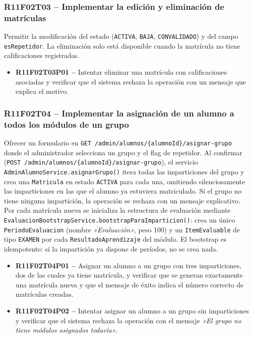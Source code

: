 \documentclass[12pt, a4paper]{report}
\begin{document}
\subsubsection{R11F02T03 -- Implementar la edición y eliminación de matrículas}
Permitir la modificación del estado (\texttt{ACTIVA}, \texttt{BAJA}, \texttt{CONVALIDADO}) y del campo \texttt{esRepetidor}. La eliminación solo está disponible cuando la matrícula no tiene calificaciones registradas.
\begin{itemize}
  \item \textbf{R11F02T03P01 --} Intentar eliminar una matrícula con calificaciones asociadas y verificar que el sistema rechaza la operación con un mensaje que explica el motivo.
\end{itemize}

\subsubsection{R11F02T04 -- Implementar la asignación de un alumno a todos los módulos de un grupo}
Ofrecer un formulario en \texttt{GET /admin/alumnos/\{alumnoId\}/asignar-grupo} donde el administrador selecciona un grupo y el flag de repetidor. Al confirmar (\texttt{POST /admin/alumnos/\{alumnoId\}/asignar-grupo}), el servicio \texttt{AdminAlumnoService.asignarGrupo()} itera todas las imparticiones del grupo y crea una \texttt{Matricula} en estado \texttt{ACTIVA} para cada una, omitiendo silenciosamente las imparticiones en las que el alumno ya estuviera matriculado. Si el grupo no tiene ninguna impartición, la operación se rechaza con un mensaje explicativo. Por cada matrícula nueva se inicializa la estructura de evaluación mediante \texttt{EvaluacionBootstrapService.bootstrapParaImparticion()}: crea un único \texttt{PeriodoEvaluacion} (nombre \textit{«Evaluación»}, peso 100) y un \texttt{ItemEvaluable} de tipo \texttt{EXAMEN} por cada \texttt{ResultadoAprendizaje} del módulo. El bootstrap es idempotente: si la impartición ya dispone de períodos, no se crea nada.
\begin{itemize}
  \item \textbf{R11F02T04P01 --} Asignar un alumno a un grupo con tres imparticiones, dos de las cuales ya tiene matrícula, y verificar que se generan exactamente una matrícula nueva y que el mensaje de éxito indica el número correcto de matrículas creadas.
  \item \textbf{R11F02T04P02 --} Intentar asignar un alumno a un grupo sin imparticiones y verificar que el sistema rechaza la operación con el mensaje \textit{«El grupo no tiene módulos asignados todavía»}.
\end{itemize}
\end{document}
